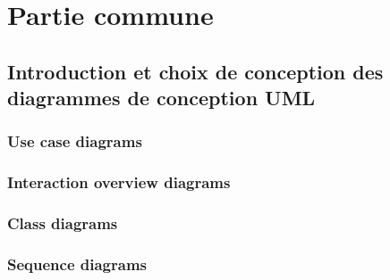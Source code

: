 \documentclass[]{report}
\begin{document}




\newpage

\tableofcontents

\newpage

\chapter{Partie commune}


\newpage




\section{Introduction et choix de conception des diagrammes de conception UML}



\subsection{Use case diagrams}

\newpage

\subsection{Interaction overview diagrams}



\newpage

\subsection{Class diagrams}



\newpage

\subsection{Sequence diagrams}


\end{document}

